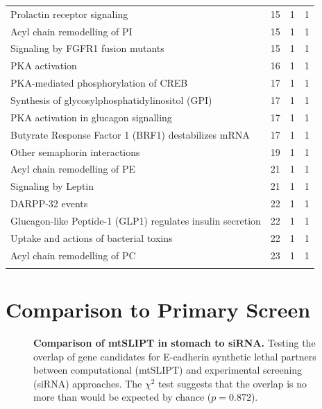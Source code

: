 \begin{table}[!Hp]
{\begin{tabular}{lccc}
  \rowcolor{Cluster_Red!15}
  Prolactin receptor signaling &  15 &   1 &   1 \\ 
  \rowcolor{Cluster_Red!20}
  Acyl chain remodelling of PI &  15 &   1 &   1 \\ 
  \rowcolor{Cluster_Red!15}
  Signaling by FGFR1 fusion mutants &  15 &   1 &   1 \\ 
  \rowcolor{Cluster_Red!20}
  PKA activation &  16 &   1 &   1 \\ 
  \rowcolor{Cluster_Red!15}
  PKA-mediated phosphorylation of CREB &  17 &   1 &   1 \\ 
  \rowcolor{Cluster_Red!20}
  Synthesis of glycosylphosphatidylinositol (GPI) &  17 &   1 &   1 \\ 
  \rowcolor{Cluster_Red!15}
  PKA activation in glucagon signalling &  17 &   1 &   1 \\ 
  \rowcolor{Cluster_Red!20}
  Butyrate Response Factor 1 (BRF1) destabilizes mRNA &  17 &   1 &   1 \\ 
  \rowcolor{Cluster_Red!15}
  Other semaphorin interactions &  19 &   1 &   1 \\ 
  \rowcolor{Cluster_Red!20}
  Acyl chain remodelling of PE &  21 &   1 &   1 \\ 
  \rowcolor{Cluster_Red!15}
  Signaling by Leptin &  21 &   1 &   1 \\ 
  \rowcolor{Cluster_Red!20}
  DARPP-32 events &  22 &   1 &   1 \\ 
  \rowcolor{Cluster_Red!15}
  Glucagon-like Peptide-1 (GLP1) regulates insulin secretion &  22 &   1 &   1 \\ 
  \rowcolor{Cluster_Red!20}
  Uptake and actions of bacterial toxins &  22 &   1 &   1 \\ 
  \rowcolor{Cluster_Red!15}
  Acyl chain remodelling of PC &  23 &   1 &   1 \\ 
  \hline
  \\
\end{tabular}
}
\end{table}

\FloatBarrier

\section{Comparison to Primary Screen}


\begin{figure}[!ht]
\begin{mdframed}
  \centering
    \caption[Comparison of mtSLIPT in stomach to siRNA]{\small \textbf{Comparison of mtSLIPT in stomach to siRNA.} Testing the overlap of gene candidates for E-cadherin synthetic lethal partners between computational (mtSLIPT) and experimental screening (siRNA) approaches. The $\chi^2$ test suggests that the overlap is no more than would be expected by chance ($p = 0.872$). %
}
\label{fig:Venn_allgenes_stad_mtSL}
\end{mdframed}
\end{figure}



